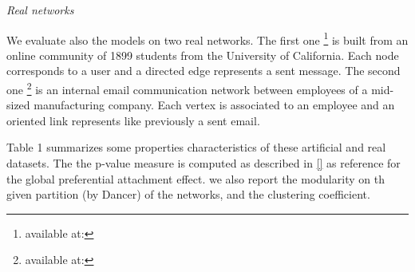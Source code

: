 \textit{Real networks}

We evaluate also the models on two  real networks.
The first one \footnote{available at:} is built from an online community of 1899 students from the University of California. Each node corresponds to a user and a    directed edge represents a sent message.
The second one \footnote{available at:} is an internal email communication network between employees of a mid-sized manufacturing company. Each vertex is associated  to an employee and an oriented link represents like previously a sent email.

Table 1 summarizes some properties characteristics of these artificial and real datasets. The  the p-value measure is computed as described in \ref{} as reference for the global preferential attachment effect. we also report the modularity on th given partition (by Dancer) of the networks, and the clustering coefficient.

